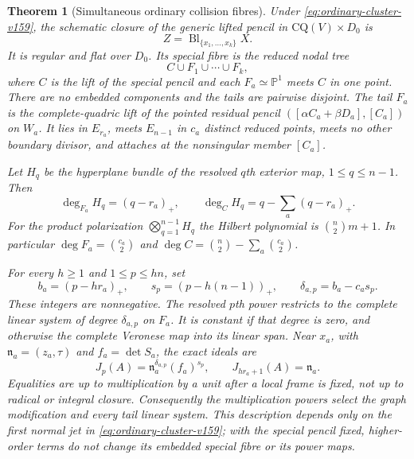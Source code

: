 \documentclass[11pt,reqno]{amsart}
\numberwithin{equation}{section}
\newtheorem{theorem}{Theorem}[section]
\theoremstyle{definition}\newtheorem{definition}[theorem]{Definition}
\theoremstyle{remark}\newtheorem{remark}[theorem]{Remark}
\newcommand{\Pj}{\mathbb P}\newcommand{\A}{\mathbb A}
\begin{document}
\begin{theorem}[Simultaneous ordinary collision fibres]
\label{thm:ordinary-fibres-v159}
Under \eqref{eq:ordinary-cluster-v159}, the schematic closure of the
generic lifted pencil in $\mathrm{CQ}(V)\times D_0$ is
\begin{equation}\label{eq:ordinary-blowup-v159}
               Z=\operatorname{Bl}_{\{x_1,\ldots,x_k\}}X.
\end{equation}
It is regular and flat over $D_0$. Its special fibre is the reduced
nodal tree
\[
                          C\cup F_1\cup\cdots\cup F_k,
\]
where $C$ is the lift of the special pencil and each $F_a\simeq\Pj^1$
meets $C$ in one point. There are no embedded components and the tails
are pairwise disjoint. The tail $F_a$ is the complete-quadric lift of
the pointed residual pencil
$([\alpha C_a+\beta D_a],[C_a])$ on $W_a$. It lies in $E_{r_a}$,
meets $E_{n-1}$ in $c_a$ distinct reduced points, meets no other
boundary divisor, and attaches at the nonsingular member $[C_a]$.

Let $H_q$ be the hyperplane bundle of the resolved $q$th exterior map,
$1\leq q\leq n-1$. Then
\begin{equation}\label{eq:ordinary-multidegrees-v159}
 \deg_{F_a}H_q=(q-r_a)_+,\qquad
 \deg_C H_q=q-\sum_a(q-r_a)_+.
\end{equation}
For the product polarization $\bigotimes_{q=1}^{n-1}H_q$ the Hilbert
polynomial is $\binom n2 m+1$. In particular
$\deg F_a=\binom{c_a}{2}$ and
$\deg C=\binom n2-\sum_a\binom{c_a}{2}$.

For every $h\geq1$ and $1\leq p\leq hn$, set
\begin{equation}\label{eq:ordinary-power-numbers-v159}
 b_a=(p-hr_a)_+,\qquad s_p=(p-h(n-1))_+,\qquad
 \delta_{a,p}=b_a-c_a s_p.
\end{equation}
These integers are nonnegative. The resolved $p$th power restricts
to the complete linear system of degree $\delta_{a,p}$ on $F_a$.
It is constant if that degree is zero, and otherwise the complete
Veronese map into its linear span. Near $x_a$, with
$\mathfrak n_a=(z_a,\tau)$ and $f_a=\det S_a$, the exact ideals are
\begin{equation}\label{eq:ordinary-power-ideals-v159}
 J_p(A)=\mathfrak n_a^{\delta_{a,p}}(f_a)^{s_p},\qquad
                   J_{hr_a+1}(A)=\mathfrak n_a.
\end{equation}
Equalities are up to multiplication by a unit after a local frame
is fixed, not up to radical or integral closure. Consequently the
multiplication powers select the graph modification and every tail
linear system. This description depends only on the first normal jet
in \eqref{eq:ordinary-cluster-v159}; with the special pencil fixed,
higher-order terms do not change its embedded special fibre or its
power maps.
\end{theorem}
\end{document}

